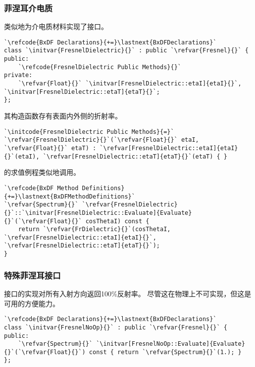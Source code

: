\subsubsection*{菲涅耳介电质}
类似地为介电质材料实现了接口。
\begin{lstlisting}
`\refcode{BxDF Declarations}{+=}\lastnext{BxDFDeclarations}`
class `\initvar{FresnelDielectric}{}` : public `\refvar{Fresnel}{}` {
public:
    `\refcode{FresnelDielectric Public Methods}{}`
private:
    `\refvar{Float}{}` `\initvar[FresnelDielectric::etaI]{etaI}{}`, `\initvar[FresnelDielectric::etaT]{etaT}{}`;
};
\end{lstlisting}

其构造函数存有表面内外侧的折射率。
\begin{lstlisting}
`\initcode{FresnelDielectric Public Methods}{=}`
`\refvar{FresnelDielectric}{}`(`\refvar{Float}{}` etaI, `\refvar{Float}{}` etaT) : `\refvar[FresnelDielectric::etaI]{etaI}{}`(etaI), `\refvar[FresnelDielectric::etaT]{etaT}{}`(etaT) { }
\end{lstlisting}

的求值例程类似地调用。
\begin{lstlisting}
`\refcode{BxDF Method Definitions}{+=}\lastnext{BxDFMethodDefinitions}`
`\refvar{Spectrum}{}` `\refvar{FresnelDielectric}{}`::`\initvar[FresnelDielectric::Evaluate]{Evaluate}{}`(`\refvar{Float}{}` cosThetaI) const {
    return `\refvar{FrDielectric}{}`(cosThetaI, `\refvar[FresnelDielectric::etaI]{etaI}{}`, `\refvar[FresnelDielectric::etaT]{etaT}{}`);
}
\end{lstlisting}

\subsubsection*{特殊菲涅耳接口}
接口的实现对所有入射方向返回100\%反射率。
尽管这在物理上不可实现，但这是可用的方便能力。
\begin{lstlisting}
`\refcode{BxDF Declarations}{+=}\lastnext{BxDFDeclarations}`
class `\initvar{FresnelNoOp}{}` : public `\refvar{Fresnel}{}` {
public:
    `\refvar{Spectrum}{}` `\initvar[FresnelNoOp::Evaluate]{Evaluate}{}`(`\refvar{Float}{}`) const { return `\refvar{Spectrum}{}`(1.); }
};
\end{lstlisting}

